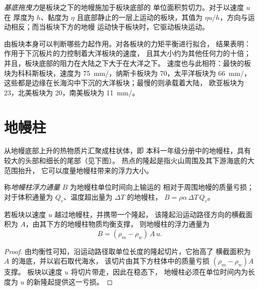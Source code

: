 \begin{definition}[基底拖曳力]\label{def:b3:mantle-convection:basal-drag}
\emph{基底拖曳力}是板块之下的地幔施加于板块底部的
单位面积剪切力。对于以速度 $u$ 在
厚度为 $h$、黏度为 $\eta$ 且底部静止的一层上运动的板块，其值为
$\eta u/h$，方向与运动相反；而当板块下方的地幔
运动快于板块时，它驱动板块运动。
\end{definition}

由板块本身可以判断哪些力起作用。对各板块的力矩平衡进行拟合，
结果表明：作用于下沉板片的力控制着大洋板块的速度，
且其大小约为其他任何力的十倍；
并且，板块底部的阻力在大陆之下大于在大洋之下。
速度也与此相符：最快的板块为科科斯板块，速度为
\qty{75}{mm/}，纳斯卡板块为 70，太平洋板块为 \qty{66}{mm/}，
这些都是边缘在长海沟中下沉的大洋板块；最慢的则承载着大陆，
欧亚板块为 23，北美板块为 20，南美板块为 \qty{11}{mm/}。

\section{地幔柱}

从地幔底部上升的热物质片汇聚成柱状体，即
本科一年级分册中的地幔柱，具有较大的头部和细长的尾部（见下图）。
热点的隆起是指火山周围及其下游海底的大范围抬升，
它可以度量地幔柱带来的浮力大小。

\begin{definition}[地幔柱浮力通量]\label{def:b3:mantle-convection:buoyancy-flux}
称\emph{地幔柱浮力通量} $B$ 为地幔柱单位时间向上输运的
相对于周围地幔的质量亏损；
对于体积通量为 $Q_v$、温度超出量为 $\Delta T$ 的地幔柱，
$B = \rho\alpha\,\Delta T\,Q_v$。
\end{definition}

\begin{proposition}[由隆起求浮力通量]\label{prop:b3:mantle-convection:swell}
若板块以速度 $u$ 越过地幔柱，并携带一个隆起，
该隆起沿运动路径方向的横截面积为 $A$，由其下方的地幔柱物质均衡支撑，
则地幔柱的浮力通量为
\[
  B = (\rho_m - \rho_w)\,A\,u .
\]
\end{proposition}

\begin{proof}
由均衡性可知，沿运动路径取单位长度的隆起切片，它抬高了
横截面积为 $A$ 的海底，并以岩石取代海水，
该切片由其下方柱体中的质量亏损 $(\rho_m - \rho_w)A$ 支撑。
板块以速度 $u$ 将切片带走，因此在稳态下，
地幔柱必须在单位时间内为长度为 $u$ 的新隆起提供这一亏损。
\end{proof}

